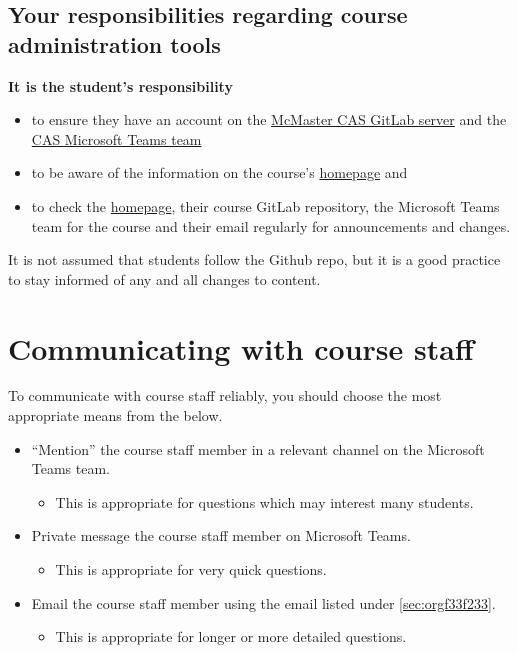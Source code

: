 \documentclass[11pt]{article}
\begin{document}
\subsection{Your responsibilities regarding course administration tools}
\label{sec:org3d4e80d}
\textbf{It is the student's responsibility}
\begin{itemize}
\item to ensure they have an account on
the \href{https://gitlab.cas.mcmaster.ca}{McMaster CAS GitLab server} and
the \href{https://teams.microsoft.com/l/team/19\%3a1f2f25fdc5e243d285e2f92216e5b483\%40thread.tacv2/conversations?groupId=a2e98537-757f-4791-b72f-2cf4d7459f28\&tenantId=44376307-b429-42ad-8c25-28cd496f4772}{CAS Microsoft Teams team}
\item to be aware of the information on the course's \href{https://armkeh.github.io/principles-of-programming-languages/}{homepage} and
\item to check the \href{https://armkeh.github.io/principles-of-programming-languages/}{homepage}, their course GitLab repository,
the Microsoft Teams team for the course
and their email regularly for announcements and changes.
\end{itemize}
It is not assumed that students follow the Github repo,
but it is a good practice to stay informed of any and all
changes to content.

\section{Communicating with course staff}
\label{sec:org2f62aa5}
To communicate with course staff reliably, you should
choose the most appropriate means from the below.
\begin{itemize}
\item “Mention” the course staff member in a relevant channel on
the Microsoft Teams team.
\begin{itemize}
\item This is appropriate for questions which may interest many students.
\end{itemize}
\item Private message the course staff member on Microsoft Teams.
\begin{itemize}
\item This is appropriate for very quick questions.
\end{itemize}
\item Email the course staff member using the email listed under \ref{sec:orgf33f233}.
\begin{itemize}
\item This is appropriate for longer or more detailed questions.
\end{itemize}
\end{itemize}
\end{document}
